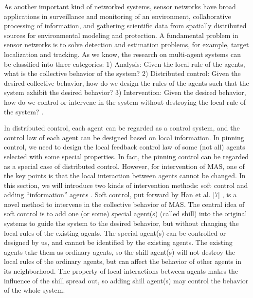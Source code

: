 \documentclass[letterpaper, 10 pt, conference]{ieeeconf}  %
\begin{document}
As another important kind of networked systems, sensor networks have broad applications in surveillance and monitoring of an environment, collaborative processing of information, and gathering scientiﬁc data from spatially distributed sources for environmental modeling and protection. A fundamental problem in sensor networks is to solve detection and estimation problems, for example, target localization and tracking. As we know, the research on multi-agent systems can be classified into three categories: 1) Analysis: Given the local rule of the agents, what is the collective behavior of the system? 2) Distributed control: Given the desired collective behavior, how do we design the rules of the agents such that the system exhibit the desired behavior? 3) Intervention: Given the desired behavior, how do we control or intervene in the system without destroying the local rule of the system? \cite{jiang2013estimation}.

In distributed control, each agent can be regarded as a control system, and the control law of each agent can be designed based on local information. In pinning control, we need to design the local feedback control law of some (not all) agents selected with some special properties. In fact, the pinning control can be regarded as a special case of distributed control. However, for intervention of MAS, one of the key points is that the local interaction between agents cannot be changed. In this section, we will introduce two kinds of intervention methods: soft control and adding “information” agents \cite{jiang2013estimation}.
Soft control, put forward by Han et al. [7] , is a novel method to intervene in the collective behavior of MAS. The central idea of soft control is to add one (or some) special agent(s) (called shill) into the original systems to guide the system to the desired behavior, but without changing the local rules of the existing agents. The special agent(s) can be controlled or designed by us, and cannot be identified by the existing agents. The existing agents take them as ordinary agents, so the shill agent(s) will not destroy the local rules of the ordinary agents, but can affect the behavior of other agents in its neighborhood. The property of local interactions between agents makes the influence of the shill spread out, so adding shill agent(s) may control the behavior of the whole system\cite{jiang2013estimation}.
\end{document}
